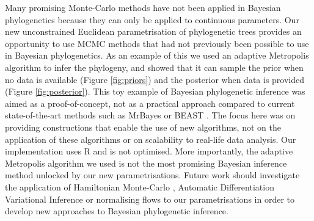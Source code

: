 \documentclass{article}
\begin{document}
Many promising Monte-Carlo methods have not been applied in Bayesian phylogenetics
because they can only be applied to continuous parameters. Our new unconstrained
Euclidean parametrisation of phylogenetic trees provides an opportunity
to use MCMC methods that had not previously been possible to use in Bayesian
phylogenetics. As an example of this we used an adaptive Metropolis algorithm \citep{Vihola2011}
to infer the phylogeny, and showed that it can sample the prior when no data is available
(Figure \ref{fig:priors}) and the posterior when data is provided (Figure \ref{fig:posterior}).
This toy example of Bayesian phylogenetic inference was aimed as a proof-of-concept,
not as a practical approach compared to current state-of-the-art methods
such as MrBayes \citep{Ronquist2012} or BEAST \citep{baeleBEASTBayesianPhylogenetic2025}.
The focus here was on providing constructions that enable the use of new algorithms, not
on the application of these algorithms or on scalability to real-life data analysis. Our implementation
uses R and is not optimised. More importantly, the adaptive Metropolis algorithm \citep{Vihola2011} 
we used is not the most promising Bayesian inference method unlocked by our 
new parametrisations. Future work should investigate the application of 
Hamiltonian Monte-Carlo \citep{Betancourt2017,Carpenter2017},
Automatic Differentiation Variational Inference \citep{JMLR:v18:16-107,bleiVariationalInferenceReview2017}
or normalising flows \citep{JMLR:v22:19-1028} to our parametrisations in order to
develop new approaches to Bayesian phylogenetic inference.

\clearpage

{}
{}
\end{document}
